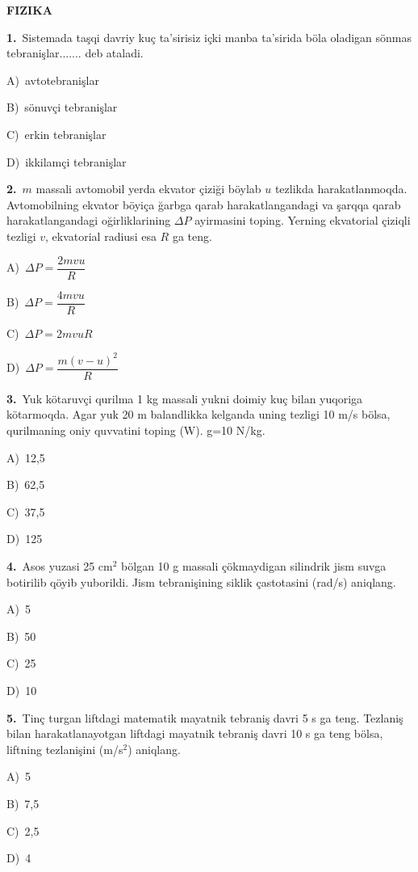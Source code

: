 \documentclass[11pt,a4paper]{article}
\newcommand{\opt}[2]{\hspace*{4mm}#1)\ #2\par}
\begin{document}
\begin{center}{\Large\textbf{FIZIKA}}\end{center}
\noindent\begin{minipage}{\linewidth}
\textbf{1.}\ Sistemada taşqi davriy kuç ta’sirisiz içki manba ta’sirida böla oladigan sönmas tebranişlar....... deb ataladi.\par\smallskip
\opt{A}{avtotebranişlar}
\opt{B}{sönuvçi tebranişlar}
\opt{C}{erkin tebranişlar}
\opt{D}{ikkilamçi tebranişlar}
\end{minipage}\vspace{9pt}\par
\noindent\begin{minipage}{\linewidth}
\textbf{2.}\ $m$ massali avtomobil yerda ekvator çiziği böylab $u$ tezlikda harakatlanmoqda. Avtomobilning ekvator böyiça ğarbga qarab harakatlangandagi va şarqqa qarab harakatlangandagi oğirliklarining $\Delta P$ ayirmasini toping. Yerning ekvatorial çiziqli tezligi $v$, ekvatorial radiusi esa $R$ ga teng.\par\smallskip
\opt{A}{$\Delta P=\dfrac{2mvu}{R}$}
\opt{B}{$\Delta P=\dfrac{4mvu}{R}$}
\opt{C}{$\Delta P=2mvuR$}
\opt{D}{$\Delta P=\dfrac{m(v-u)^2}{R}$}
\end{minipage}\vspace{9pt}\par
\noindent\begin{minipage}{\linewidth}
\textbf{3.}\ Yuk kötaruvçi qurilma 1 kg massali yukni doimiy kuç bilan yuqoriga kötarmoqda. Agar yuk 20 m balandlikka kelganda uning tezligi 10 m/s bölsa, qurilmaning oniy quvvatini toping (W). g=10 N/kg.\par\smallskip
\opt{A}{12,5}
\opt{B}{62,5}
\opt{C}{37,5}
\opt{D}{125}
\end{minipage}\vspace{9pt}\par
\noindent\begin{minipage}{\linewidth}
\textbf{4.}\ Asos yuzasi 25 cm$^{2}$ bölgan 10 g massali çökmaydigan silindrik jism suvga botirilib qöyib yuborildi. Jism tebranişining siklik çastotasini (rad/s) aniqlang.\par\smallskip
\opt{A}{5}
\opt{B}{50}
\opt{C}{25}
\opt{D}{10}
\end{minipage}\vspace{9pt}\par
\noindent\begin{minipage}{\linewidth}
\textbf{5.}\ Tinç turgan liftdagi matematik mayatnik tebraniş davri 5 s ga teng. Tezlaniş bilan harakatlanayotgan liftdagi mayatnik tebraniş davri 10 s ga teng bölsa, liftning tezlanişini (m/s$^{2}$) aniqlang.\par\smallskip
\opt{A}{5}
\opt{B}{7,5}
\opt{C}{2,5}
\opt{D}{4}
\end{minipage}\vspace{9pt}\par
\end{document}
